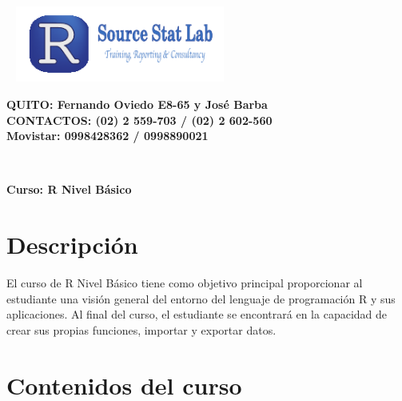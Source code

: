 \documentclass[11pt,a4paper,oneside]{article}\usepackage[]{graphicx}\usepackage[]{color}
\begin{document}
\begin{minipage}[d]{115mm}
\includegraphics[height=2.5cm, width=7.5cm]{logo_ult.pdf}
\end{minipage}
\begin{minipage}[d]{70mm}
\textsf{\textbf{\sc \tiny {\bf QUITO}: Fernando Oviedo E8-65 y José Barba}}\\
\textsf{\textbf{\sc \tiny {\bf CONTACTOS}: (02) 2 559-703 / (02) 2 602-560\\ Movistar: 0998428362 / 0998890021}}
\end{minipage}\\
\vspace{0.4cm}

\begin{center}
{\bf \Large Curso: R Nivel Básico}
\end{center}

\section{Descripción}
  
El curso de R Nivel Básico tiene como objetivo principal proporcionar al estudiante una visión general del entorno del lenguaje de programación R y sus aplicaciones. Al final del curso, el estudiante se encontrará en la capacidad de crear sus propias funciones, importar y exportar datos.

\section{Contenidos del curso}
\end{document}
